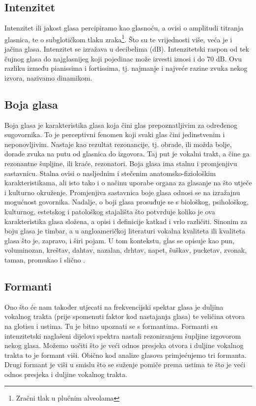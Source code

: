 \documentclass[times, utf8, diplomski]{fer}
\begin{document}
\subsection{Intenzitet}
Intenzitet ili jakost glasa percipiramo kao glasnoću, a ovisi o amplitudi titranja glasnica, te o  subglotičkom tlaku zraka\footnote{Zračni tlak u plućnim alveolama}. Što su te vrijednosti više, veća je i jačina glasa. Intenzitet se izražava u decibelima (dB). Intenzitetski raspon od tek čujnog glasa do najglasnijeg koji pojedinac može izvesti iznosi i do 70 dB. Ovu razliku između pianissima i fortissima, tj. najmanje i najveće razine zvuka nekog izvora, nazivamo dinamikom.

\subsection{Boja glasa}
Boja glasa je karakteristika glasa koja čini glas prepoznatljivim za određenog sugovornika. To je perceptivni fenomen koji svaki glas čini jedinstvenim i neponovljivim. Nastaje kao rezultat rezonancije, tj. obrade, ili možda bolje, dorade zvuka na putu od glasnica do izgovora. Taj put je vokalni trakt, a čine ga rezonantne šupljine, ili kraće, rezonatori. Boja glasa ima stalnu i promjenjivu sastavnicu. Stalna ovisi o  nasljednim i stečenim anatomsko-fiziološkim karakteristikama, ali isto tako i o načinu uporabe organa za glasanje na što utječe i kulturno okruženje. Promjenjiva sastavnica boje glasa odnosi se na izražajnu mogućnost govornika. Nadalje, o boji glasa prosuđuje se s biološkog, psihološkog, kulturnog, estetskog i patološkog stajališta što potvrduje koliko je ova karakteristika glasa složena, a opisi i definicije katkad i vrlo različiti. Sinonim za boju glasa je timbar, a u angloameričkoj literaturi vokalna kvaliteta ili kvaliteta glasa što je, zapravo, i širi pojam. U tom kontekstu, glas se opisuje kao pun, voluminozan, kreštav, dahtav, nazalan, drhtav, napet, šuškav, pucketav, zvonak, taman, promukao i slično \citep{optimala}. 

\subsection{Formanti}
Ono što će nam također utjecati na frekvencijski spektar glasa je duljina vokalnog trakta (prije spomenuti faktor kod nastajanja glasa) te veličina otvora na glotisu i ustima. Tu je bitno upoznati se s formantima. Formanti su intenzitetski naglašeni dijelovi spektra nastali rezoniranjem šupljine izgovorom nekog glasa. Možemo uočiti što je veći odnos presjeka otvora i duljine vokalnog trakta to je formant viši. Obično kod analize glasova primjećujemo tri formanta. Drugi formant je viši u smislu što se suženje pomiče prema ustima te što je veći odnos presjeka i duljine vokalnog trakta.
\end{document}

